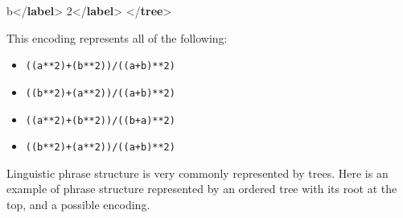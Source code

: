 \begin{shaded}
\mbox{}\newline 
\hspace*{1em}b{</\textbf{label}>}\mbox{}\newline 
{}\mbox{}\newline 
{}\mbox{}\newline 
\hspace*{1em}2{</\textbf{label}>}\mbox{}\newline 
{}\mbox{}\newline 
{</\textbf{tree}>}\end{shaded}\egroup\par \par
This encoding represents all of the following: \begin{itemize}
\item \texttt{((a**2)+(b**2))/((a+b)**2)}
\item \texttt{((b**2)+(a**2))/((a+b)**2)}
\item \texttt{((a**2)+(b**2))/((b+a)**2)}
\item \texttt{((b**2)+(a**2))/((a+b)**2)}
\end{itemize} \par
Linguistic phrase structure is very commonly represented by trees. Here is an example of phrase structure represented by an ordered tree with its root at the top, and a possible encoding. \par

